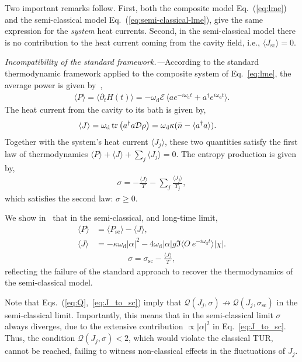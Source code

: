 \documentclass[aps,twocolumn,10pt,prl,floatfix,nofootinbib, superscriptaddress]{revtex4-2}
\newcommand{\nb}{\bar{n}}
\begin{document}
Two important remarks follow. First, both the composite model Eq.~(\ref{eq:lme}) and the semi-classical model Eq.~(\ref{eq:semi-classical-lme}), give the same expression for the \textit{system} heat currents. Second, in the semi-classical model there is no contribution to the heat current coming from the cavity field, i.e., $\langle J_\text{sc} \rangle = 0$.

\textit{Incompatibility of the standard framework.—}According to the standard thermodynamic framework applied to the composite system of Eq.~\eqref{eq:lme}, the average power is given by~\cite{Potts_2021},
\begin{align}
    \langle P \rangle= \langle\partial_t H(t) \rangle = -\omega_\text{d} \mathcal{E}\, \langle a e^{-i\omega_\text{d}t} + a^\dagger e^{i\omega_\text{d}t}\rangle.
\end{align}
The heat current from the cavity to its bath is given by,
\begin{align}
   \langle J\rangle &= \omega_\text{d} \tr\qty( a^\dagger a \mathcal{D} \rho) = \omega_\text{d} \kappa (\nb - \langle a^\dagger a \rangle).
\end{align}
Together with the system's heat current $\langle J_j \rangle$, these two quantities satisfy the first law of thermodynamics $\langle P \rangle + \langle J \rangle + \sum_j \langle J_j \rangle =0$.
The entropy production is given by,
\begin{align}
       \sigma = -\frac{\langle J\rangle}{T} - \sum_j\frac{\langle J_j\rangle}{T_j},
\end{align}
which satisfies the second law: $\sigma\geq 0$.

We show in~\cite{supmat} that in the semi-classical, and long-time limit,
\begin{align}
        \langle P \rangle &= \langle P_\text{sc} \rangle -\langle J \rangle, \label{eq:P_to_sc}\\
    \langle J \rangle &= -\kappa \omega_\text{d}|\alpha|^2 - 4 \omega_\text{d} |\alpha| g \Im \langle O ~ e^{-i\omega_\text{d}t} \rangle |\chi|\label{eq:J_to_sc}.
\end{align}
\begin{align}
    \sigma = \sigma_\text{sc} - \frac{\langle J \rangle }{T},\label{eq:sigma_standard}
\end{align}
reflecting the failure of the standard approach to recover the thermodynamics of the semi-classical model.

Note that Eqs.~(\ref{eq:Q},~\ref{eq:J_to_sc}) imply that $\mathcal{Q}(J_j, \sigma) \not \to \mathcal{Q}(J_j, \sigma_\text{sc}) $ in the semi-classical limit. Importantly, this means that in the semi-classical limit $\sigma$ always diverges, due to the extensive contribution $\propto |\alpha|^2$ in Eq.~\eqref{eq:J_to_sc}.
Thus, the condition $\mathcal{Q}(J_j, \sigma)<2$, which would violate the classical TUR, cannot be reached, failing to witness non-classical effects in the fluctuations of $J_j$.
\end{document}
